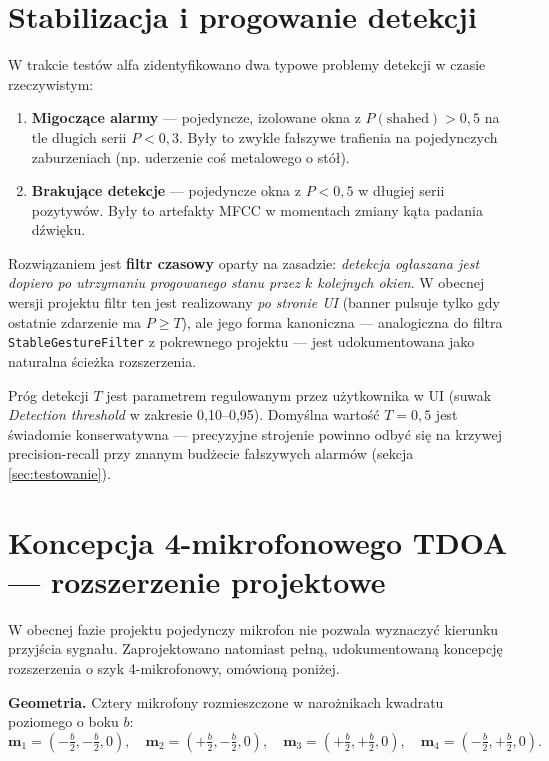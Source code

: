 \documentclass[11pt,a4paper]{article}
\newcommand{\sectionref}[1]{sekcja \ref{#1}}
\begin{document}
\section{Stabilizacja i progowanie detekcji}

W trakcie testów alfa zidentyfikowano dwa typowe problemy detekcji w czasie
rzeczywistym:
\begin{enumerate}[noitemsep]
  \item \textbf{Migoczące alarmy} --- pojedyncze, izolowane okna z
        $P(\text{shahed}) > 0{,}5$ na tle długich serii $P < 0{,}3$. Były to
        zwykle fałszywe trafienia na pojedynczych zaburzeniach (np. uderzenie
        coś metalowego o stół).
  \item \textbf{Brakujące detekcje} --- pojedyncze okna z $P < 0{,}5$ w
        długiej serii pozytywów. Były to artefakty MFCC w momentach zmiany
        kąta padania dźwięku.
\end{enumerate}

Rozwiązaniem jest \textbf{filtr czasowy} oparty na zasadzie: \emph{detekcja
ogłaszana jest dopiero po utrzymaniu progowanego stanu przez $k$ kolejnych
okien}. W obecnej wersji projektu filtr ten jest realizowany \emph{po stronie
UI} (banner pulsuje tylko gdy ostatnie zdarzenie ma $P \geq T$), ale jego
forma kanoniczna --- analogiczna do filtra \texttt{StableGestureFilter} z
pokrewnego projektu --- jest udokumentowana jako naturalna ścieżka rozszerzenia.

Próg detekcji $T$ jest parametrem regulowanym przez użytkownika w UI
(suwak \emph{Detection threshold} w zakresie 0{,}10--0{,}95). Domyślna wartość
$T = 0{,}5$ jest świadomie konserwatywna --- precyzyjne strojenie powinno odbyć
się na krzywej precision-recall przy znanym budżecie fałszywych alarmów
(\sectionref{sec:testowanie}).

\section{Koncepcja 4-mikrofonowego TDOA --- rozszerzenie projektowe}
\label{sec:tdoa}

W obecnej fazie projektu pojedynczy mikrofon nie pozwala wyznaczyć kierunku
przyjścia sygnału. Zaprojektowano natomiast pełną, udokumentowaną koncepcję
rozszerzenia o szyk 4-mikrofonowy, omówioną poniżej.

\textbf{Geometria.} Cztery mikrofony rozmieszczone w narożnikach kwadratu
poziomego o boku $b$:
\begin{equation}
\mathbf{m}_1 = \left(-\tfrac{b}{2}, -\tfrac{b}{2}, 0\right), \quad
\mathbf{m}_2 = \left(+\tfrac{b}{2}, -\tfrac{b}{2}, 0\right), \quad
\mathbf{m}_3 = \left(+\tfrac{b}{2}, +\tfrac{b}{2}, 0\right), \quad
\mathbf{m}_4 = \left(-\tfrac{b}{2}, +\tfrac{b}{2}, 0\right).
\end{equation}
\end{document}
